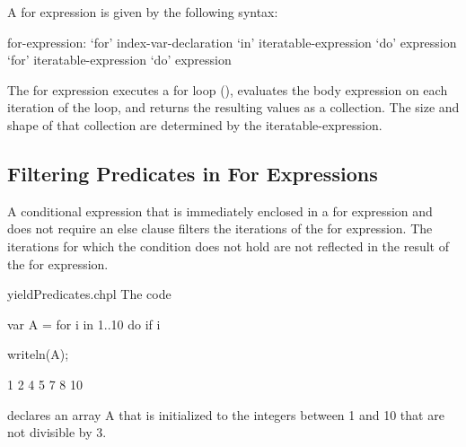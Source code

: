 A for expression is given by the following syntax:
\begin{syntax}
for-expression:
  `for' index-var-declaration `in' iteratable-expression `do' expression
  `for' iteratable-expression `do' expression
\end{syntax}
The for expression executes a for loop (),
evaluates the body expression on each iteration of the loop,
and returns the resulting values as a collection.
The size and shape of that collection
are determined by the iteratable-expression.

\subsection{Filtering Predicates in For Expressions}
\label{Filtering_Predicates_For}

A conditional expression that is immediately enclosed in a for
expression and does not require an else clause filters the iterations of the for expression.
The iterations for which the condition does not hold
are not reflected in the result of the for expression.

\begin{chapelexample}{yieldPredicates.chpl}
The code
\begin{chapel}
var A = for i in 1..10 do if i %
\end{chapel}
\begin{chapelpost}
writeln(A);
\end{chapelpost}
\begin{chapeloutput}
1 2 4 5 7 8 10
\end{chapeloutput}
declares an array A that is initialized to the integers between
1 and 10 that are not divisible by 3.
\end{chapelexample}
